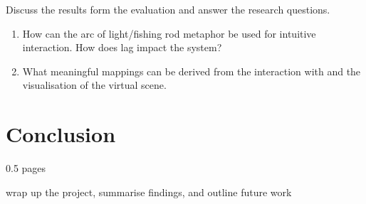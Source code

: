 \documentclass[10pt,a4paper]{scrartcl}
\begin{document}
Discuss the results form the evaluation and answer the research questions.

\begin{enumerate}
\item How can the arc of light/fishing rod metaphor be used for intuitive interaction. How does lag impact the system?
\item What meaningful mappings can be derived from the interaction with and the visualisation of the virtual scene.
\end{enumerate}

\section{Conclusion}
0.5 pages

wrap up the project, summarise findings, and outline future work




% 
% 
\end{document}
